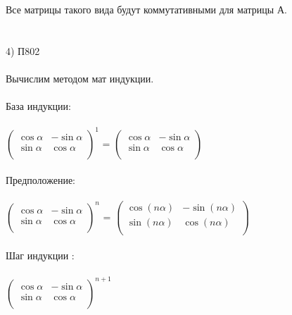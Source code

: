 \documentclass[12pt, a4paper]{article}
\begin{document}
	\\\\\\
	Все матрицы такого вида будут коммутативными для матрицы А.
	\\\\\\
	4) П802
	\\\\
	Вычислим методом мат индукции. \\\\
	База индукции: \\\\
	\begin{math}
		\left(
		\begin{array}{rr}
			\cos\alpha  & -\sin\alpha \\
			\sin\alpha & \cos\alpha \\
		\end{array}
		\right ) ^1
	\end{math}
	=
	\begin{math}
		\left(
		\begin{array}{rr}
			\cos\alpha  & -\sin\alpha \\
			\sin\alpha & \cos\alpha \\
		\end{array}
		\right )
	\end{math}
	\\\\
	Предположение:
	\\\\
	\begin{math}
		\left(
		\begin{array}{rr}
			\cos\alpha  & -\sin\alpha \\
			\sin\alpha & \cos\alpha \\
		\end{array}
		\right ) ^n
	\end{math}
	=
	\begin{math}
		\left(
		\begin{array}{rr}
			\cos (n\alpha)  & -\sin (n\alpha) \\
			\sin (n\alpha) & \cos (n\alpha) \\
		\end{array}
		\right )
	\end{math}
	\\\\
	Шаг индукции :
	\\\\
	\begin{math}
		\left(
		\begin{array}{rr}
			\cos\alpha  & -\sin\alpha \\
			\sin\alpha & \cos\alpha \\
		\end{array}
		\right ) ^{n+1}
	\end{math}
\end{document}
